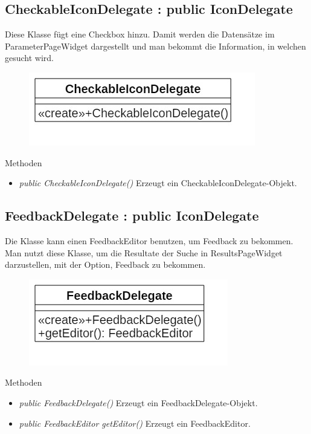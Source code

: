 \subsection*{CheckableIconDelegate : public IconDelegate}
Diese Klasse fügt eine Checkbox hinzu. Damit werden die Datensätze im ParameterPageWidget dargestellt und man bekommt die Information, in welchen gesucht wird.

\begin{figure}[H]
	\centering
	\includegraphics[scale=0.5]{img/Klassendiagramm/Klassen/View/CheckableIconDelegate}
	\label{fig:checkableIconDelegate}
\end{figure}

Methoden
\begin{itemize}
	\item\textit{public CheckableIconDelegate()}
	Erzeugt ein CheckableIconDelegate-Objekt.
\end{itemize} 

\subsection*{FeedbackDelegate : public IconDelegate}
Die Klasse kann einen FeedbackEditor benutzen, um Feedback zu bekommen. Man nutzt diese Klasse, um die Resultate der Suche in ResultsPageWidget darzustellen, mit der Option, Feedback zu bekommen. 

\begin{figure}[H]
	\centering
	\includegraphics[scale=0.5]{img/Klassendiagramm/Klassen/View/FeedbackDelegate}
	\label{fig:feedbackDelegate}
\end{figure}

Methoden
\begin{itemize}
	\item\textit{public FeedbackDelegate()}
	Erzeugt ein FeedbackDelegate-Objekt.
	\item\textit{public FeedbackEditor getEditor()}
	Erzeugt ein FeedbackEditor.
\end{itemize}

